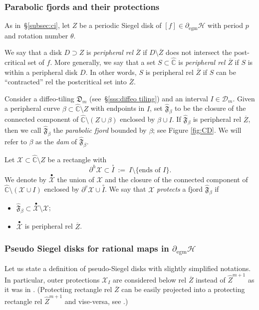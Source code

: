 \documentclass[11pt, reqno]{amsart}
\numberwithin{equation}{section}
\theoremstyle{plain}
\theoremstyle{theorem}
\theoremstyle{plain}
\theoremstyle{definition}
\numberwithin{figure}{section}
\newcommand{\wC}{\widehat{\mathbb{C}}}
\newcommand{\upbullet}[1]{\overset{\bullet}{ #1}{}}
\newcommand\XX{\mathcal{X}}
\newcommand{\wZ}{{\widehat Z}}
\newcommand{\egm}{{\operatorname{egm}}}
\begin{document}
\subsubsection{Parabolic fjords and their protections}\label{sss:zW:conventions}
As in~\S\ref{subsec:ci}, let $Z$ be a periodic Siegel disk of $[f]\in \partial _\egm \mathcal H$ with period $p$ and rotation number $\theta$. 

We say that a disk $D\supset Z$ is {\em peripheral rel $\overline Z$} if $D\setminus \overline Z$ does not intersect the post-critical set of $f$. More generally, we say that a set $S\subset \wC$ is {\em peripheral rel $\overline Z$} if $S$ is within a peripheral disk $D$. In other words, $S$ is peripheral rel $\overline Z$ if $S$ can be ``contracted'' rel the postcritical set into $\overline Z$.


Consider a diffeo-tiling $\mathfrak D_m$ (see~\S\ref{sss:diffeo tiling}) and an interval $I\in \mathcal D_m$. Given a peripheral curve $\beta \subset \wC\setminus Z$ with endpoints in $I$, set $\widehat{\mathfrak F}_\beta$ to be the closure of the connected component of $\wC\setminus (Z\cup \beta)$ enclosed by $\beta \cup I$. If $\widehat{\mathfrak F}_\beta$ is peripheral rel $\overline Z$, then we call $\widehat{\mathfrak F}_\beta$ the \emph{parabolic fjord} bounded by $\beta$; see Figure \ref{fig:CD}. We will refer to $\beta$ as the \emph{dam} of $\widehat{\mathfrak F}_\beta$.



Let $\XX\subset \wC\setminus Z$ be a rectangle with \[\partial^{h} \XX\subset \overset{\circ} {I}\ := \ I\setminus \{\text{ends of $I$}\}.\] We denote by $\upbullet \XX$ the union of $\XX$ and the closure of the connected component of $\wC\setminus (\XX\cup I)$ enclosed by $\partial^v \XX \cup \overset{\circ} {I}$. We say that $\XX$ \emph{protects} a fjord $\widehat{\mathfrak F}_\beta$ if
\begin{itemize}
    \item $\widehat{\mathfrak F}_\beta\subset \upbullet \XX\setminus \XX$;
    \item $\upbullet \XX$ is peripheral rel $\overline Z$.
\end{itemize}












\subsubsection{Pseudo Siegel disks for rational maps in $\partial_\egm \mathcal H$} \label{sss:defn:pseudo-Siegel disks} Let us state a definition of pseudo-Siegel disks with slightly simplified notations. In particular, outer protections $\XX_I$ are considered below rel $\overline Z$ instead of $\widehat Z^{m+1}$ as it was in \cite[Assumption 6]{DL22}. (Protecting rectangle rel $\overline Z$ can be easily projected into a protecting rectangle rel $\wZ^{m+1}$ and vise-versa, see \cite[ Lemma 5.9]{DL22}.) 
\end{document}

